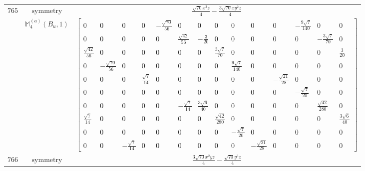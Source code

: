 \documentclass[fleqn,8pt,landscape]{jsarticle}
\begin{document}
\begin{longtable}{ccc}
$ 765 $ & $ \text{symmetry} $ & $ \frac{\sqrt{70} x^{3} z}{4} - \frac{3 \sqrt{70} x y^{2} z}{4} $ \\
$  $ & $ \mathbb{M}_{4}^{(a)}(B_{u},1) $ & $ \begin{bmatrix} 0 & 0 & 0 & 0 & - \frac{\sqrt{70}}{56} & 0 & 0 & 0 & 0 & 0 & 0 & - \frac{9 \sqrt{7}}{140} & 0 & 0 \\ 0 & 0 & 0 & 0 & 0 & \frac{\sqrt{42}}{56} & - \frac{3}{20} & 0 & 0 & 0 & 0 & 0 & - \frac{3 \sqrt{7}}{70} & 0 \\ \frac{\sqrt{42}}{56} & 0 & 0 & 0 & 0 & 0 & 0 & \frac{3 \sqrt{7}}{70} & 0 & 0 & 0 & 0 & 0 & \frac{3}{20} \\ 0 & - \frac{\sqrt{70}}{56} & 0 & 0 & 0 & 0 & 0 & 0 & \frac{9 \sqrt{7}}{140} & 0 & 0 & 0 & 0 & 0 \\ 0 & 0 & 0 & \frac{\sqrt{7}}{14} & 0 & 0 & 0 & 0 & 0 & 0 & - \frac{\sqrt{21}}{28} & 0 & 0 & 0 \\ 0 & 0 & 0 & 0 & 0 & 0 & 0 & 0 & 0 & 0 & 0 & - \frac{\sqrt{7}}{20} & 0 & 0 \\ 0 & 0 & 0 & 0 & 0 & - \frac{\sqrt{7}}{14} & \frac{3 \sqrt{6}}{40} & 0 & 0 & 0 & 0 & 0 & \frac{\sqrt{42}}{280} & 0 \\ \frac{\sqrt{7}}{14} & 0 & 0 & 0 & 0 & 0 & 0 & \frac{\sqrt{42}}{280} & 0 & 0 & 0 & 0 & 0 & \frac{3 \sqrt{6}}{40} \\ 0 & 0 & 0 & 0 & 0 & 0 & 0 & 0 & - \frac{\sqrt{7}}{20} & 0 & 0 & 0 & 0 & 0 \\ 0 & 0 & - \frac{\sqrt{7}}{14} & 0 & 0 & 0 & 0 & 0 & 0 & - \frac{\sqrt{21}}{28} & 0 & 0 & 0 & 0 \end{bmatrix} $ \\ \hline
$ 766 $ & $ \text{symmetry} $ & $ \frac{3 \sqrt{70} x^{2} y z}{4} - \frac{\sqrt{70} y^{3} z}{4} $ \\

\end{longtable}
\end{document}

